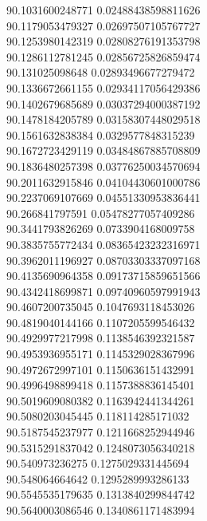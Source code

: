 {90.1031600248771 0.02488438598811626 \\
90.1179053479327 0.02697507105767727 \\
90.1253980142319 0.02808276191353798 \\
90.1286112781245 0.02856725826859474 \\
90.131025098648 0.02893496677279472 \\
90.1336672661155 0.02934117056429386 \\
90.1402679685689 0.03037294000387192 \\
90.1478184205789 0.03158307448029518 \\
90.1561632838384 0.0329577848315239 \\
90.1672723429119 0.03484867885708809 \\
90.1836480257398 0.03776250034570694 \\
90.2011632915846 0.04104430601000786 \\
90.2237069107669 0.04551330953836441 \\
90.266841797591 0.05478277057409286 \\
90.3441793826269 0.0733904168009758 \\
90.3835755772434 0.08365423232316971 \\
90.3962011196927 0.08703303337097168 \\
90.4135690964358 0.09173715859651566 \\
90.4342418699871 0.09740960597991943 \\
90.4607200735045 0.1047693118453026 \\
90.4819040144166 0.1107205599546432 \\
90.4929977217998 0.1138546392321587 \\
90.4953936955171 0.1145329028367996 \\
90.4972672997101 0.1150636151432991 \\
90.4996498899418 0.1157388836145401 \\
90.5019609080382 0.1163942441344261 \\
90.5080203045445 0.118114285171032 \\
90.5187545237977 0.1211668252944946 \\
90.5315291837042 0.1248073056340218 \\
90.540973236275 0.1275029331445694 \\
90.548064664642 0.1295289993286133 \\
90.5545535179635 0.1313840299844742 \\
90.5640003086546 0.1340861171483994 \\
}
